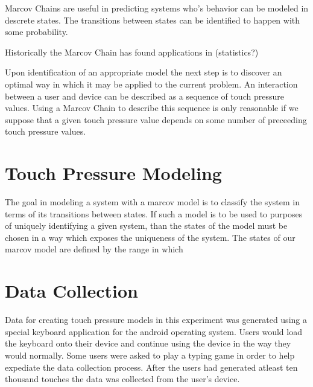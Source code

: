 \documentclass{acm_proc_article-sp}
\begin{document}
Marcov Chains are useful in predicting systems who's behavior can be modeled in descrete states. The transitions between states can be identified to happen with some probability.

Historically the Marcov Chain has found applications in (statistics?)

Upon identification of an appropriate model the next step is to discover an optimal way in which it may be applied to the current problem. An interaction between a user and device can be described as a sequence of touch pressure values. Using a Marcov Chain to describe this sequence is only reasonable if we suppose that a given touch pressure value depends on some number of preceeding touch pressure values. \cite{marcov_chains_previous_n_values}
%

\section{Touch Pressure Modeling}
\label{touch_pressure_modeling}
%
The goal in modeling a system with a marcov model is to classify the system in terms of its transitions between states. If such a model is to be used to purposes of uniquely identifying a given system, than the states of the model must be chosen in a way which exposes the uniqueness of the system.
The states of our marcov model are defined by the range in which

\section{Data Collection}
\label{sec:data_collection}
Data for creating touch pressure models in this experiment was generated using a special keyboard application for the android operating system. Users would load the keyboard onto their device and continue using the device in the way they would normally. Some users were asked to play a typing game in order to help expediate the data collection process. After the users had generated atleast ten thousand touches the data was collected from the user's device.
\end{document}
